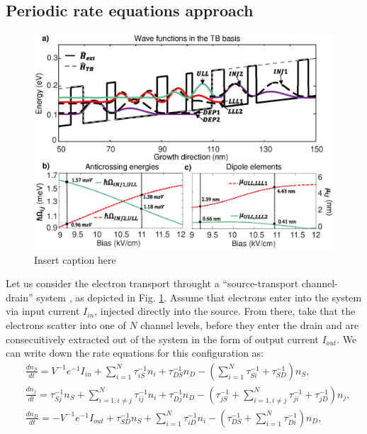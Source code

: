 \documentclass[10pt,letterpaper]{article}
\begin{document}
\subsection{Periodic rate equations approach}
\label{subsec:periodicrate}
\begin{figure}[h!]
\centering
\includegraphics[scale=0.7]{img02} \caption{ Insert caption here}\label{fig:rate_equations}
\end{figure}
Let us consider the electron transport throught a ``source-transport channel-drain'' system , as depicted in Fig. \ref{fig:rate_equations}. Assume that electrons enter into the system via input current $I_{in}$, injected directly into the source. From there, take that the electrons scatter into one of $N$ channel levels, before they enter the drain and are consecuitively extracted out of the system in the form of output current $I_{out}$. We can write down the rate equations for this configuration as:
\begin{align}
& \frac{d n_S} {dt } = V^{-1}e^{-1}I_{in} +  \sum_{i=1}^{N} \tau_{iS}^{-1}n_i + \tau_{DS}^{-1} n_D - \left( \sum_{i=1}^N \tau_{Si}^{-1} + \tau_{SD}^{-1}\right) n_S, \nonumber \\
& \frac{d n_j} {dt } = \tau_{Sj}^{-1} n_S +   \sum_{i=1 , i\neq j}^{N} \tau_{ij}^{-1}n_i + \tau_{Dj}^{-1} n_D - \left(  \tau_{jS}^{-1}  + \sum_{i=1 , i\neq j}^N \tau_{ji}^{-1}  + \tau_{jD}^{-1}\right) n_j, \nonumber \\
& \frac{d n_D} {dt } =  -V^{-1}e^{-1}I_{out}  + \tau_{SD}^{-1} n_S +   \sum_{i=1}^{N} \tau_{iD}^{-1}n_i - \left(  \tau_{DS}^{-1}  + \sum_{i=1}^N \tau_{Di}^{-1}  \right) n_D, \nonumber
\end{align} 
\end{document}
